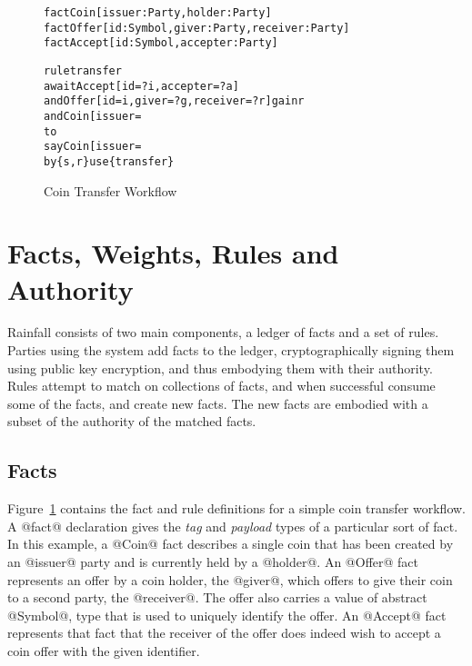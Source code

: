 
\clearpage{}


\begin{figure}
\begin{small}
\begin{alltt}
fact  Coin   [issuer: Party, holder: Party]
fact  Offer  [id: Symbol, giver: Party, receiver: Party]
fact  Accept [id: Symbol, accepter: Party]

rule  transfer
await Accept [id = ?i, accepter = ?a]
  and Offer  [id = i,  giver = ?g, receiver = ?r] gain r
  and Coin   [issuer = %Ivan, holder = g] gain s
to
  say Coin   [issuer = %Ivan, holder = r]
   by \{s, r\} use \{transfer\}
\end{alltt}
\end{small}
\caption{Coin Transfer Workflow}
\label{f:CoinTransfer}
\end{figure}


\section{Facts, Weights, Rules and Authority}
Rainfall consists of two main components, a ledger of facts and a set of rules. Parties using the system add facts to the ledger, cryptographically signing them using public key encryption, and thus embodying them with their authority. Rules attempt to match on collections of facts, and when successful consume some of the facts, and create new facts. The new facts are embodied with a subset of the authority of the matched facts.


\subsection{Facts}
Figure~\ref{f:CoinTransfer} contains the fact and rule definitions for a simple coin transfer workflow. A @fact@ declaration gives the \emph{tag} and \emph{payload} types of a particular sort of fact. In this example, a @Coin@ fact describes a single coin that has been created by an @issuer@ party and is currently held by a @holder@. An @Offer@ fact represents an offer by a coin holder, the @giver@, which offers to give their coin to a second party, the @receiver@. The offer also carries a value of abstract @Symbol@, type that is used to uniquely identify the offer. An @Accept@ fact represents that fact that the receiver of the offer does indeed wish to accept a coin offer with the given identifier.

